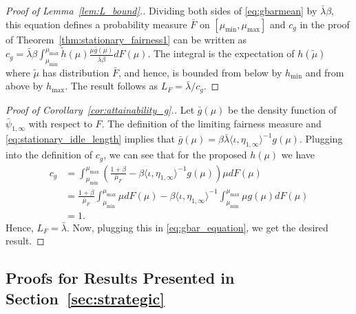 \documentclass[a4paper,11pt,twoside]{article}
\numberwithin{equation}{section}
\numberwithin{figure}{section}
\theoremstyle{plain}
\newcommand{\1}{\mathbbm{1}}
\begin{document}
\begin{proof}[Proof of Lemma~\ref{lem:L_bound}.]
Dividing both sides of \eqref{eq:gbarmean} by $\bar{\lambda}\beta$, this equation defines a probability measure $\bar{F}$ on $[\mu_{\min},\mu_{\max}]$ and $c_g$ in the proof of Theorem~\ref{thm:stationary_fairness1} can be written as $c_g=\bar{\lambda}\beta \int_{\mu_{\min}}^{\mu_{\max}}\tilde{h}(\mu) \frac{\mu\bar{g}(\mu)}{\bar{\lambda}\beta}dF(\mu)$. The integral is the expectation of $h(\tilde{\mu})$ where $\tilde{\mu}$ has distribution $\bar{F}$, and hence, is bounded from below by $h_{\min}$ and from above by $h_{\max}$. 
The result follows as $L_F=\bar{\lambda}/c_g$.
\end{proof}



\begin{proof}[Proof of Corollary~\ref{cor:attainability_g}.]
Let $\bar{g}(\mu)$ be the density function of $\bar{\psi}_{1,\infty}$ with respect to $F$. The definition of the limiting fairness measure and \eqref{eq:stationary_idle_length} implies that $\bar{g}(\mu)=\beta\bar{\lambda}\langle \iota,\eta_{1,\infty}\rangle^{-1} g(\mu)$. Plugging into the definition of $c_g$, we can see that for the proposed $h(\mu)$ we have
\begin{align*}
    c_g&=\int_{\mu_{\min}}^{\mu_{\max}}\left(\frac{1+\beta}{\bar{\mu}_F}-\beta\langle \iota,\eta_{1,\infty} \rangle^{-1}g(\mu)\right)\mu dF(\mu)\\
    &=\frac{1+\beta}{\bar{\mu}_F}\int_{\mu_{\min}}^{\mu_{\max}}\mu dF(\mu)-\beta\langle \iota,\eta_{1,\infty} \rangle^{-1}\int_{\mu_{\min}}^{\mu_{\max}}\mu g(\mu)dF(\mu)\\
    &=1.
\end{align*}
Hence, $L_F=\bar{\lambda}$. Now, plugging this in \eqref{eq:gbar_equation}, we get the desired result. \end{proof}




\subsection{Proofs for Results Presented in Section~\ref{sec:strategic}}\label{app:strategic}
\end{document}
